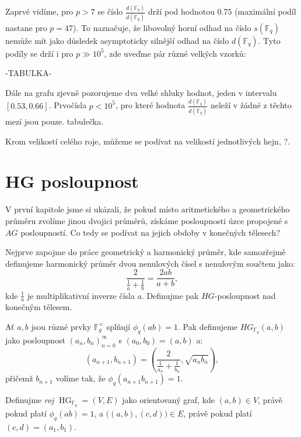 \documentclass[12pt]{report}
\DeclareMathOperator{\HG}{HG}
\begin{document}
Zaprvé vidíme, pro $p>7$ se číslo $\frac{d(\mathbb{F_q})}{d(\mathbb{F}_q)}$ drží pod hodnotou $0.75$ (maximální podíl nastane pro $p=47$). To naznačuje, že libovolný horní odhad na číslo $s(\mathbb{F}_q)$ nemůže mít jako důsledek asymptoticky silnější odhad na číslo $d(\mathbb{F}_q)$. Tyto podíly se drží i pro $p \gg 10^5$, zde uveďme pár různé velkých vzorků:

-TABULKA-

Dále na grafu zjevně pozorujeme dva velké shluky hodnot, jeden v intervalu $[0.53,0.66]$. Prvočísla $p<10^5$, pro které hodnota $\frac{d(\mathbb{F_q})}{d(\mathbb{F}_q)}$ neleží v žádné z těchto mezí jsou pouze.
tabulečka.


Krom velikostí celého roje, můžeme se podívat na velikostí jednotlivých hejn, ?.


\section{HG posloupnost}


V první kapitole jsme si ukázali, že pokud místo aritmetického a geometrického průměru zvolíme jinou dvojici průměrů, získáme posloupnosti úzce propojené s $AG$ posloupností. Co tedy se podívat na jejich obdoby v konečných tělesech? 


Nejprve zapojme do práce geometrický a harmonický průměr, kde samozřejmě definujeme harmonický průměr dvou nenulových čísel s nenulovým součtem jako:
$$\frac{2}{\frac{1}{a}+\frac{1}{b}} = \frac{2ab}{a+b},$$
kde $\frac{1}{a}$ je multiplikativní inverze čísla $a$. Definujme pak $HG$-posloupnost nad konečným tělesem.


\begin{definice}
Ať $a,b$ jsou různé prvky $\mathbb{F}_q ^{\times}$ splňují $\phi_q (ab) = 1$. Pak definujeme $HG_{\mathbb{F}_q}(a,b)$ jako posloupnost $(a_n,b_n)_{n=0}^{\infty}$ s $(a_0,b_0) = (a,b)$ a:
\begin{equation*}
\left(a_{n+1},b_{n+1} \right) = \left(\frac{2}{\frac{1}{a_n} + \frac{1}{b_n}}, \sqrt{a_n b_n} \right),
\end{equation*}
přičemž $b_{n+1}$ volíme tak, že $\phi_q (a_{n+1} b_{n+1}) = 1$.
\end{definice}

\begin{definice}
Definujme \textit{roj} $\HG_{\mathbb{F}_q} = (V,E)$ jako orientovaný graf, kde $(a,b) \in V$, právě pokud platí $\phi_q(ab) = 1$, a $\big((a,b),(c,d)\big) \in E$, právě pokud platí $(c,d) = (a_1,b_1)$.
\end{definice}
\end{document}

